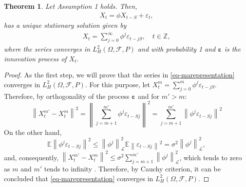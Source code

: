 \documentclass[11pt,a4paper]{article}
\newtheorem{Theorem} {Theorem}[section]
\numberwithin{equation}{section}
\newcommand{\E}{\mathbb{E}}
\begin{document}
\begin{Theorem}\label{thm-moving}
  Let Assumption 1 holds. Then,
  \begin{align}\label{eq-mean zero}
    X_t=\phi X_{t-S}+\varepsilon_t,
  \end{align}
  has a unique stationary solution given by
  \begin{align}\label{eq-marepresentation}
    X_t=\sum_{j=0}^\infty \phi^{j}\varepsilon_{t-jS}, \quad t\in {\mathbb{Z}},
  \end{align}
  where the series converges in $L^2_{H}(\Omega,\mathcal{F},P)$ and with probability 1 and $\bm{\varepsilon}$ is the innovation process of $X_t.$
\end{Theorem}
\begin{proof}
  As the first step, we will prove that the series in \eqref{eq-marepresentation} converges in $L^2_{H}(\Omega,\mathcal{F},P)$. For this purpose, let $X_t^m=\sum_{j=0}^m \phi^j\varepsilon_{t-jS}$. Therefore, by orthogonality of the process $\bm{\varepsilon}$ and for $m'>m:$
  \[
    \left\|X_t^{m'}-X_t^m\right\|^2
      = \left\|\sum_{j=m+1}^{m'}\phi^j\varepsilon_{t-Sj}\right\|^2
      = \sum_{j=m+1}^{m'} \left\|\phi^j\varepsilon_{t-Sj}\right\|^2
  \]
  On the other hand,
  \[
    \E\left\|\phi^j\varepsilon_{t-Sj}\right\|^2
      \leq \left\|\phi^j\right\|^2_\mathcal{L} \E\left\|\varepsilon_{t-Sj}\right\|^2
      = \sigma^2\left\|\phi^j\right\|^2_\mathcal{L},
  \]
  and, consequently, $\left\|X_t^{m'}-X_t^m\right\|^2 \leq \sigma^2\sum_{j=m+1}^{m'}\left\|\phi^j\right\|^2_\mathcal{L}$, which tends to zero as $m$ and $m'$ tends to infinity \citep[See Lemma 3.1][]{Bosq2000}. Therefore, by Cauchy criterion, it can be concluded that \eqref{eq-marepresentation} converges in $L^2_{H}(\Omega,\mathcal{F},P).$


\end{proof}
\end{document}
